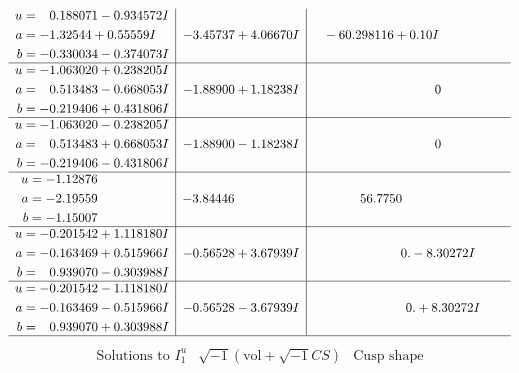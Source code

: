 \documentclass[1p]{elsarticle_modified}
\theoremstyle{definition}
\newcommand{\I}{\sqrt{-1}}
\begin{document}
$$\begin{array}{c|c|c}
\begin{aligned}
u &= \phantom{-}0.188071 - 0.934572 I \\
a &= -1.32544 + 0.55559 I \\
b &= -0.330034 - 0.374073 I\end{aligned}
 & -3.45737 + 4.06670 I & \phantom{-}                -6
0.298116 + 0. 10   I\phantom{ +0.000000I} \\ \hline\begin{aligned}
u &= -1.063020 + 0.238205 I \\
a &= \phantom{-}0.513483 - 0.668053 I \\
b &= -0.219406 + 0.431806 I\end{aligned}
 & -1.88900 + 1.18238 I & \phantom{-0.000000 } 0 \\ \hline\begin{aligned}
u &= -1.063020 - 0.238205 I \\
a &= \phantom{-}0.513483 + 0.668053 I \\
b &= -0.219406 - 0.431806 I\end{aligned}
 & -1.88900 - 1.18238 I & \phantom{-0.000000 } 0 \\ \hline\begin{aligned}
u &= -1.12876\phantom{ +0.000000I} \\
a &= -2.19559\phantom{ +0.000000I} \\
b &= -1.15007\phantom{ +0.000000I}\end{aligned}
 & -3.84446\phantom{ +0.000000I} & \phantom{-}56.7750\phantom{ +0.000000I} \\ \hline\begin{aligned}
u &= -0.201542 + 1.118180 I \\
a &= -0.163469 + 0.515966 I \\
b &= \phantom{-}0.939070 - 0.303988 I\end{aligned}
 & -0.56528 + 3.67939 I & \phantom{-0.000000 } 0. - 8.30272 I \\ \hline\begin{aligned}
u &= -0.201542 - 1.118180 I \\
a &= -0.163469 - 0.515966 I \\
b &= \phantom{-}0.939070 + 0.303988 I\end{aligned}
 & -0.56528 - 3.67939 I & \phantom{-0.000000 -}0. + 8.30272 I\\
 \hline 
 \end{array}$$\newpage$$\begin{array}{c|c|c}  
\text{Solutions to }I^u_{1}& \I (\text{vol} + \sqrt{-1}CS) & \text{Cusp shape}\\

\end{array}$$
\end{document}
